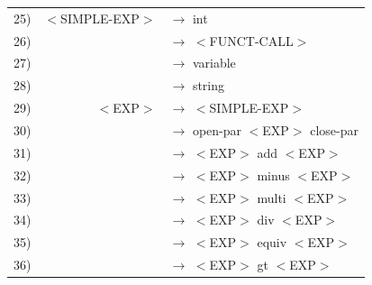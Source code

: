 \documentclass[a4paper,10pt]{article}
\begin{document}
\begin{tabular}{rrl}
25)&$<$SIMPLE-EXP$>$	& $\rightarrow$ int \\
26)&					& $\rightarrow$ $<$FUNCT-CALL$>$ \\
27)&					& $\rightarrow$ variable \\
28)&					& $\rightarrow$ string \\				

29)&$<$EXP$>$			& $\rightarrow$ $<$SIMPLE-EXP$>$   \\
30)&					& $\rightarrow$ open-par $<$EXP$>$ close-par\\ 
31)&					& $\rightarrow$ $<$EXP$>$ add $<$EXP$>$ \\
32)&					& $\rightarrow$ $<$EXP$>$ minus $<$EXP$>$ \\
33)&					& $\rightarrow$ $<$EXP$>$ multi $<$EXP$>$ \\
34)&					& $\rightarrow$ $<$EXP$>$ div $<$EXP$>$ \\
35)&					& $\rightarrow$ $<$EXP$>$ equiv $<$EXP$>$ \\
36)&					& $\rightarrow$ $<$EXP$>$ gt $<$EXP$>$ \\
					
					
\end{tabular}
\end{document}
